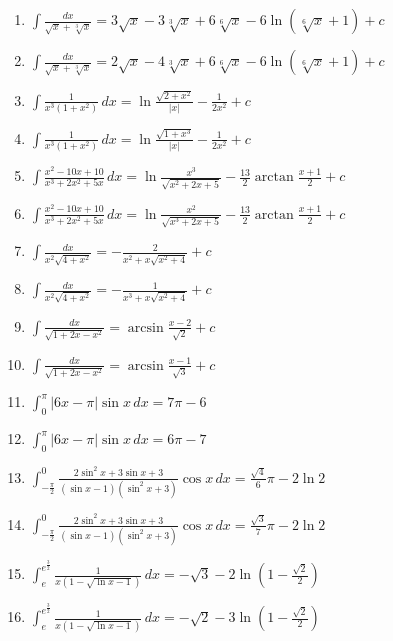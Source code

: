 \documentclass[11pt,a4paper]{article}
\begin{document}
\begin{enumerate}
\item $\displaystyle \int \frac{dx}{\sqrt{x} + \sqrt[3]{x}} = 3\sqrt{x} - 3\sqrt[3]{x} + 6\sqrt[6]{x} - 6\ln\left(\sqrt[6]{x} + 1\right) + c$
\item $\displaystyle \int \frac{dx}{\sqrt{x} + \sqrt[3]{x}} = 2\sqrt{x} - 4\sqrt[3]{x} + 6\sqrt[6]{x} - 6\ln\left(\sqrt[6]{x} + 1\right) + c$
\item $\displaystyle \int \frac{1}{x^{3}\left(1 + x^{2}\right)} \, dx = \ln\frac{\sqrt{2 + x^{2}}}{|x|} - \frac{1}{2x^{2}} + c$
\item $\displaystyle \int \frac{1}{x^{3}\left(1 + x^{2}\right)} \, dx = \ln\frac{\sqrt{1 + x^{3}}}{|x|} - \frac{1}{2x^{2}} + c$
\item $\displaystyle \int \frac{x^{2} - 10x + 10}{x^{3} + 2x^{2} + 5x} \, dx = \ln\frac{x^{3}}{\sqrt{x^{2} + 2x + 5}} - \frac{13}{2}\arctan\frac{x + 1}{2} + c$
\item $\displaystyle \int \frac{x^{2} - 10x + 10}{x^{3} + 2x^{2} + 5x} \, dx = \ln\frac{x^{2}}{\sqrt{x^{3} + 2x + 5}} - \frac{13}{2}\arctan\frac{x + 1}{2} + c$
\item $\displaystyle \int \frac{dx}{x^{2}\sqrt{4 + x^{2}}} = -\frac{2}{x^{2} + x\sqrt{x^{2} + 4}} + c$
\item $\displaystyle \int \frac{dx}{x^{2}\sqrt{4 + x^{2}}} = -\frac{1}{x^{3} + x\sqrt{x^{2} + 4}} + c$
\item $\displaystyle \int \frac{dx}{\sqrt{1 + 2x - x^{2}}} = \arcsin\frac{x - 2}{\sqrt{2}} + c$
\item $\displaystyle \int \frac{dx}{\sqrt{1 + 2x - x^{2}}} = \arcsin\frac{x - 1}{\sqrt{3}} + c$
\item $\displaystyle \int_{0}^{\pi} |6x - \pi|\sin x \, dx = 7\pi - 6$
\item $\displaystyle \int_{0}^{\pi} |6x - \pi|\sin x \, dx = 6\pi - 7$
\item $\displaystyle \int_{-\frac{\pi}{2}}^{0} \frac{2\sin^{2} x + 3\sin x + 3}{(\sin x - 1)\left(\sin^{2} x + 3\right)}\cos x \, dx = \frac{\sqrt{4}}{6}\pi - 2\ln 2$
\item $\displaystyle \int_{-\frac{\pi}{2}}^{0} \frac{2\sin^{2} x + 3\sin x + 3}{(\sin x - 1)\left(\sin^{2} x + 3\right)}\cos x \, dx = \frac{\sqrt{3}}{7}\pi - 2\ln 2$
\item $\displaystyle \int_{e}^{e^{\frac{3}{2}}} \frac{1}{x\left(1 - \sqrt{\ln x - 1}\right)} \, dx = -\sqrt{3} - 2\ln\left(1 - \frac{\sqrt{2}}{2}\right)$
\item $\displaystyle \int_{e}^{e^{\frac{3}{2}}} \frac{1}{x\left(1 - \sqrt{\ln x - 1}\right)} \, dx = -\sqrt{2} - 3\ln\left(1 - \frac{\sqrt{2}}{2}\right)$

\end{enumerate}
\end{document}
